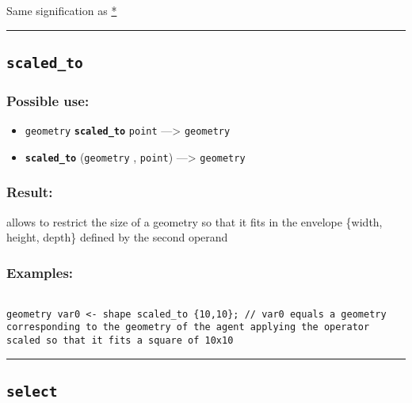 \documentclass[]{book}
\providecommand{\tightlist}{%
  \setlength{\itemsep}{0pt}\setlength{\parskip}{0pt}}
\theoremstyle{definition}
\theoremstyle{definition}
\theoremstyle{definition}
\theoremstyle{remark}
\begin{document}
Same signification as \href{OperatorsAA\#*}{*}

\begin{center}\rule{0.5\linewidth}{\linethickness}\end{center}

\subsection{\texorpdfstring{\texttt{scaled\_to}}{scaled\_to}}\label{scaled_to}

\subsubsection{Possible use:}\label{possible-use-451}

\begin{itemize}
\tightlist
\item
  \texttt{geometry} \textbf{\texttt{scaled\_to}} \texttt{point}
  ---\textgreater{} \texttt{geometry}
\item
  \textbf{\texttt{scaled\_to}} (\texttt{geometry} , \texttt{point})
  ---\textgreater{} \texttt{geometry}
\end{itemize}

\subsubsection{Result:}\label{result-436}

allows to restrict the size of a geometry so that it fits in the
envelope \{width, height, depth\} defined by the second operand

\subsubsection{Examples:}\label{examples-310}

\begin{verbatim}
 
geometry var0 <- shape scaled_to {10,10}; // var0 equals a geometry corresponding to the geometry of the agent applying the operator scaled so that it fits a square of 10x10
\end{verbatim}

\begin{center}\rule{0.5\linewidth}{\linethickness}\end{center}

\subsection{\texorpdfstring{\texttt{select}}{select}}\label{select}
\end{document}
